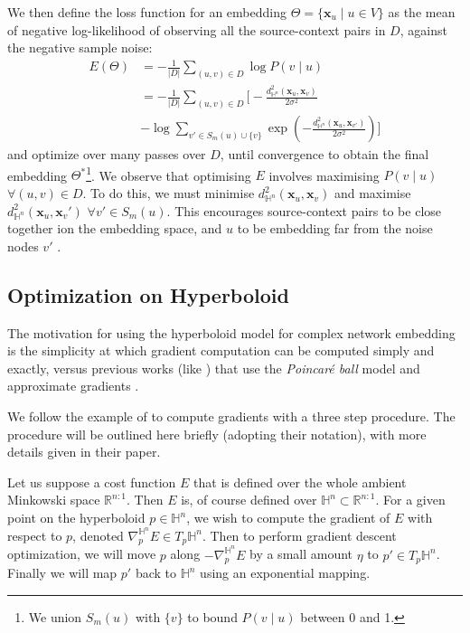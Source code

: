\documentclass{article}
\DeclareMathOperator*{\argmin}{argmin}
\begin{document}
We then define the loss function for an embedding $\Theta = \{\textbf{x}_u \mid u \in V \}$ as the mean of negative log-likelihood of observing all the source-context pairs in $D$, against the negative sample noise:
\begin{align*}
E(\Theta) &= -\frac{1}{|D|} \sum_{(u, v) \in D} \log P(v\mid u)\\
&= -\frac{1}{|D|} \sum_{(u, v) \in D} \Bigg[ -\frac {d^2_{\mathbb{H}^n}(\textbf{x}_u, \textbf{x}_v)}{2\sigma^2}\\
&-\log \sum_{v' \in S_m(u) \cup \{v\}} \exp\left(-\frac{d^2_{\mathbb{H}^n}(\textbf{x}_u, \textbf{x}_{v'})}{2\sigma^2} \right)\Bigg]
\end{align*}
and optimize over many passes over $D$, until convergence to obtain the final embedding $\Theta^*$\footnote{We union $S_m(u)$ with $\{ v \}$ to bound $P(v\mid u)$ between 0 and 1.}.
We observe that optimising $E$ involves maximising $P(v\mid u)$ $\forall (u,v)\in D$.
To do this, we must minimise $d^2_{\mathbb{H}^n}(\textbf{x}_u, \textbf{x}_v)$ and maximise $d^2_{\mathbb{H}^n}(\textbf{x}_u, \textbf{x}_v')$ $\forall v' \in S_m(u)$.
This encourages source-context pairs to be close together ion the embedding space, and $u$ to be embedding far from the noise nodes $v'$ \cite{nickel2017poincar}.

\subsection{Optimization on Hyperboloid}
The motivation for using the hyperboloid model for complex network embedding is the simplicity at which gradient computation can be computed simply and exactly, versus previous works (like \cite{nickel2017poincar,de2018representation}) that use the \textit{Poincar\'e ball} model and approximate gradients \cite{wilson2018gradient}.

We follow the example of \cite{wilson2018gradient} to compute gradients with a three step procedure. 
The procedure will be outlined here briefly (adopting their notation), with more details given in their paper. 

Let us suppose a cost function $E$ that is defined over the whole ambient Minkowski space $\mathbb{R}^{n:1}$.
Then $E$ is, of course defined over $\mathbb{H}^n \subset \mathbb{R}^{n:1}$.
For a given point on the hyperboloid $p \in \mathbb{H}^n$, we wish to compute the gradient of $E$ with respect to $p$, denoted $\nabla^{\mathbb{H}^n}_p E \in T_p \mathbb{H}^n$.
Then to perform gradient descent optimization, we will move $p$ along $-\nabla^{\mathbb{H}^n}_p E$ by a small amount $\eta$ to $p'\in T_p \mathbb{H}^n $.
Finally we will map $p'$ back to $\mathbb{H}^n$ using an exponential mapping.
\end{document}
